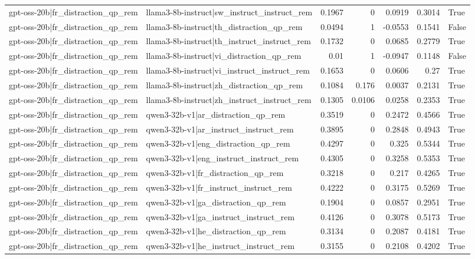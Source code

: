 \begin{table}
\begin{tabular}{l l r r r r l}
gpt-oss-20b|fr_distraction_qp_rem & llama3-8b-instruct|sw_instruct_instruct_rem & 0.1967 & 0 & 0.0919 & 0.3014 & True \\
gpt-oss-20b|fr_distraction_qp_rem & llama3-8b-instruct|th_distraction_qp_rem & 0.0494 & 1 & -0.0553 & 0.1541 & False \\
gpt-oss-20b|fr_distraction_qp_rem & llama3-8b-instruct|th_instruct_instruct_rem & 0.1732 & 0 & 0.0685 & 0.2779 & True \\
gpt-oss-20b|fr_distraction_qp_rem & llama3-8b-instruct|vi_distraction_qp_rem & 0.01 & 1 & -0.0947 & 0.1148 & False \\
gpt-oss-20b|fr_distraction_qp_rem & llama3-8b-instruct|vi_instruct_instruct_rem & 0.1653 & 0 & 0.0606 & 0.27 & True \\
gpt-oss-20b|fr_distraction_qp_rem & llama3-8b-instruct|zh_distraction_qp_rem & 0.1084 & 0.176 & 0.0037 & 0.2131 & True \\
gpt-oss-20b|fr_distraction_qp_rem & llama3-8b-instruct|zh_instruct_instruct_rem & 0.1305 & 0.0106 & 0.0258 & 0.2353 & True \\
gpt-oss-20b|fr_distraction_qp_rem & qwen3-32b-v1|ar_distraction_qp_rem & 0.3519 & 0 & 0.2472 & 0.4566 & True \\
gpt-oss-20b|fr_distraction_qp_rem & qwen3-32b-v1|ar_instruct_instruct_rem & 0.3895 & 0 & 0.2848 & 0.4943 & True \\
gpt-oss-20b|fr_distraction_qp_rem & qwen3-32b-v1|eng_distraction_qp_rem & 0.4297 & 0 & 0.325 & 0.5344 & True \\
gpt-oss-20b|fr_distraction_qp_rem & qwen3-32b-v1|eng_instruct_instruct_rem & 0.4305 & 0 & 0.3258 & 0.5353 & True \\
gpt-oss-20b|fr_distraction_qp_rem & qwen3-32b-v1|fr_distraction_qp_rem & 0.3218 & 0 & 0.217 & 0.4265 & True \\
gpt-oss-20b|fr_distraction_qp_rem & qwen3-32b-v1|fr_instruct_instruct_rem & 0.4222 & 0 & 0.3175 & 0.5269 & True \\
gpt-oss-20b|fr_distraction_qp_rem & qwen3-32b-v1|ga_distraction_qp_rem & 0.1904 & 0 & 0.0857 & 0.2951 & True \\
gpt-oss-20b|fr_distraction_qp_rem & qwen3-32b-v1|ga_instruct_instruct_rem & 0.4126 & 0 & 0.3078 & 0.5173 & True \\
gpt-oss-20b|fr_distraction_qp_rem & qwen3-32b-v1|he_distraction_qp_rem & 0.3134 & 0 & 0.2087 & 0.4181 & True \\
gpt-oss-20b|fr_distraction_qp_rem & qwen3-32b-v1|he_instruct_instruct_rem & 0.3155 & 0 & 0.2108 & 0.4202 & True \\

\end{tabular}
\end{table}
